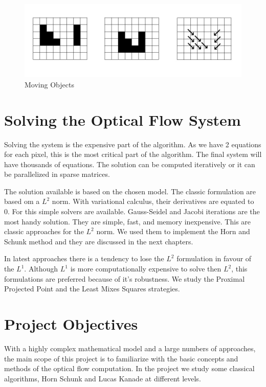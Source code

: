 \documentclass[12pt,a4paper,twoside]{report}
\begin{document}
\begin{figure} \label{moreflow}
	\centering
	\includegraphics[width = 5in]{img/morefow} 
	\caption{Moving Objects}
\end{figure}

\section{Solving the Optical Flow System}

Solving the system is the expensive part of the algorithm. 
As we have 2 equations for each pixel, this is the most critical part of the algorithm. The final system will have thousands of equations. The solution can be computed iteratively or it can be parallelized in sparse matrices. 

The solution available is based on the chosen model. The classic formulation are based om a $L^2$ norm. With variational calculus, their derivatives are equated to 0. For this simple solvers are available. Gauss-Seidel and Jacobi iterations are the most handy solution. They are simple, fast, and memory inexpensive. This are classic approaches for the $L^2$ norm. We used them to implement the Horn and Schunk method and they are discussed in the next chapters.

In latest approaches there is a tendency to lose the $L^2$ formulation in favour of the $L^1$. Although $L^1$ is more computationally expensive to solve then $L^2$, this formulations are preferred because of it's robustness. We study the Proximal Projected Point and the Least Mixes Squares strategies.

\section{Project Objectives}

With a highly complex mathematical model and a large numbers of approaches, the main scope of this project is to familiarize with the basic concepts and methods of the optical flow computation. In the project we study some classical algorithms, Horn Schunk and Lucas Kanade at different levels.
\end{document}
